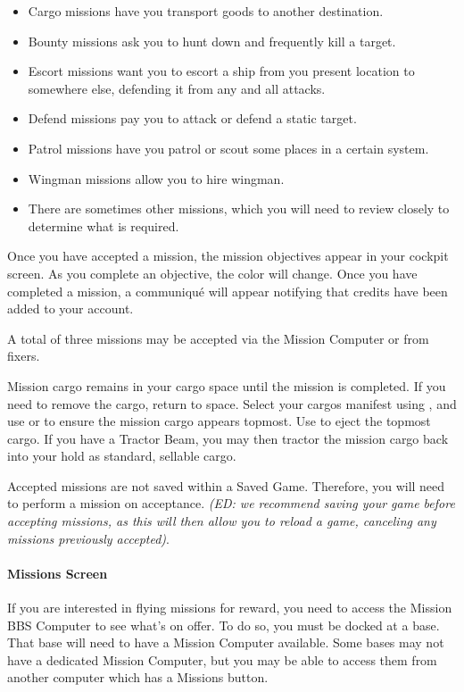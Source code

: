\documentclass{article}
\newcommand{\key}[1]{%
  \tikz[baseline=(key.base)]{
    \node[draw=gray!50, fill=gray!5, rounded corners=2pt, inner sep=2pt, minimum height=1.5ex] (key) {\footnotesize\sffamily\bfseries #1};
  }%
}
\begin{document}
\begin{itemize}
\item  Cargo missions have you transport goods to another destination. 
\item  Bounty missions ask you to hunt down and frequently kill a target. 
\item  Escort missions want you to escort a ship from you present location to somewhere else, defending it from any and all attacks. 
\item  Defend missions pay you to attack or defend a static target. 
\item  Patrol missions have you patrol or scout some places in a certain system. 
\item  Wingman missions allow you to hire wingman. 
\item  There are sometimes other missions, which you will need to review closely to determine what is required. 
\end{itemize}

Once you have accepted a mission, the mission objectives appear in your cockpit screen. As you complete an objective, the color will change. Once you have completed a mission, a communiqué will appear notifying that credits have been added to your account. 

A total of three missions may be accepted via the Mission Computer or from fixers. 

Mission cargo remains in your cargo space until the mission is completed. If you need to remove the cargo, return to space. Select your cargos manifest using \key{w}, and use \key{PGUP} or \key{PGDN} to ensure the mission cargo appears topmost. Use \key{Z} to eject the topmost cargo. If you have a Tractor Beam, you may then tractor the mission cargo back into your hold as standard, sellable cargo. 

Accepted missions are not saved within a Saved Game. Therefore, you will need to perform a mission on acceptance. \textit{(ED: we recommend saving your game before accepting missions, as this will then allow you to reload a game, canceling any missions previously accepted)}. 

\paragraph{Missions Screen}

If you are interested in flying missions for reward, you need to access the Mission BBS Computer to see what's on offer. To do so, you must be docked at a base. That base will need to have a Mission Computer available. Some bases may not have a dedicated Mission Computer, but you may be able to access them from another computer which has a Missions button. 
\end{document}
